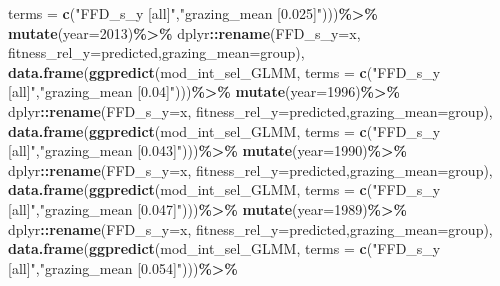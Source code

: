 \documentclass[
]{article}
\newenvironment{Shaded}{\begin{snugshade}}{\end{snugshade}}
\newcommand{\DataTypeTok}[1]{\textcolor[rgb]{0.13,0.29,0.53}{#1}}
\newcommand{\DecValTok}[1]{\textcolor[rgb]{0.00,0.00,0.81}{#1}}
\newcommand{\KeywordTok}[1]{\textcolor[rgb]{0.13,0.29,0.53}{\textbf{#1}}}
\newcommand{\NormalTok}[1]{#1}
\newcommand{\OperatorTok}[1]{\textcolor[rgb]{0.81,0.36,0.00}{\textbf{#1}}}
\newcommand{\StringTok}[1]{\textcolor[rgb]{0.31,0.60,0.02}{#1}}
\begin{document}
\begin{Shaded}
\begin{Highlighting}[]
                         \DataTypeTok{terms =} \KeywordTok{c}\NormalTok{(}\StringTok{"FFD\_s\_y [all]"}\NormalTok{,}\StringTok{"grazing\_mean [0.025]"}\NormalTok{)))}\OperatorTok{\%\textgreater{}\%}
\StringTok{      }\KeywordTok{mutate}\NormalTok{(}\DataTypeTok{year=}\DecValTok{2013}\NormalTok{)}\OperatorTok{\%\textgreater{}\%}
\StringTok{      }\NormalTok{dplyr}\OperatorTok{::}\KeywordTok{rename}\NormalTok{(}\DataTypeTok{FFD\_s\_y=}\NormalTok{x, }\DataTypeTok{fitness\_rel\_y=}\NormalTok{predicted,}\DataTypeTok{grazing\_mean=}\NormalTok{group),}
    \KeywordTok{data.frame}\NormalTok{(}\KeywordTok{ggpredict}\NormalTok{(mod\_int\_sel\_GLMM,}
                         \DataTypeTok{terms =} \KeywordTok{c}\NormalTok{(}\StringTok{"FFD\_s\_y [all]"}\NormalTok{,}\StringTok{"grazing\_mean [0.04]"}\NormalTok{)))}\OperatorTok{\%\textgreater{}\%}
\StringTok{      }\KeywordTok{mutate}\NormalTok{(}\DataTypeTok{year=}\DecValTok{1996}\NormalTok{)}\OperatorTok{\%\textgreater{}\%}
\StringTok{      }\NormalTok{dplyr}\OperatorTok{::}\KeywordTok{rename}\NormalTok{(}\DataTypeTok{FFD\_s\_y=}\NormalTok{x, }\DataTypeTok{fitness\_rel\_y=}\NormalTok{predicted,}\DataTypeTok{grazing\_mean=}\NormalTok{group),}
    \KeywordTok{data.frame}\NormalTok{(}\KeywordTok{ggpredict}\NormalTok{(mod\_int\_sel\_GLMM,}
                         \DataTypeTok{terms =} \KeywordTok{c}\NormalTok{(}\StringTok{"FFD\_s\_y [all]"}\NormalTok{,}\StringTok{"grazing\_mean [0.043]"}\NormalTok{)))}\OperatorTok{\%\textgreater{}\%}
\StringTok{      }\KeywordTok{mutate}\NormalTok{(}\DataTypeTok{year=}\DecValTok{1990}\NormalTok{)}\OperatorTok{\%\textgreater{}\%}
\StringTok{      }\NormalTok{dplyr}\OperatorTok{::}\KeywordTok{rename}\NormalTok{(}\DataTypeTok{FFD\_s\_y=}\NormalTok{x, }\DataTypeTok{fitness\_rel\_y=}\NormalTok{predicted,}\DataTypeTok{grazing\_mean=}\NormalTok{group),}
    \KeywordTok{data.frame}\NormalTok{(}\KeywordTok{ggpredict}\NormalTok{(mod\_int\_sel\_GLMM,}
                         \DataTypeTok{terms =} \KeywordTok{c}\NormalTok{(}\StringTok{"FFD\_s\_y [all]"}\NormalTok{,}\StringTok{"grazing\_mean [0.047]"}\NormalTok{)))}\OperatorTok{\%\textgreater{}\%}
\StringTok{      }\KeywordTok{mutate}\NormalTok{(}\DataTypeTok{year=}\DecValTok{1989}\NormalTok{)}\OperatorTok{\%\textgreater{}\%}
\StringTok{      }\NormalTok{dplyr}\OperatorTok{::}\KeywordTok{rename}\NormalTok{(}\DataTypeTok{FFD\_s\_y=}\NormalTok{x, }\DataTypeTok{fitness\_rel\_y=}\NormalTok{predicted,}\DataTypeTok{grazing\_mean=}\NormalTok{group),}
    \KeywordTok{data.frame}\NormalTok{(}\KeywordTok{ggpredict}\NormalTok{(mod\_int\_sel\_GLMM,}
                         \DataTypeTok{terms =} \KeywordTok{c}\NormalTok{(}\StringTok{"FFD\_s\_y [all]"}\NormalTok{,}\StringTok{"grazing\_mean [0.054]"}\NormalTok{)))}\OperatorTok{\%\textgreater{}\%}

\end{Highlighting}
\end{Shaded}
\end{document}
